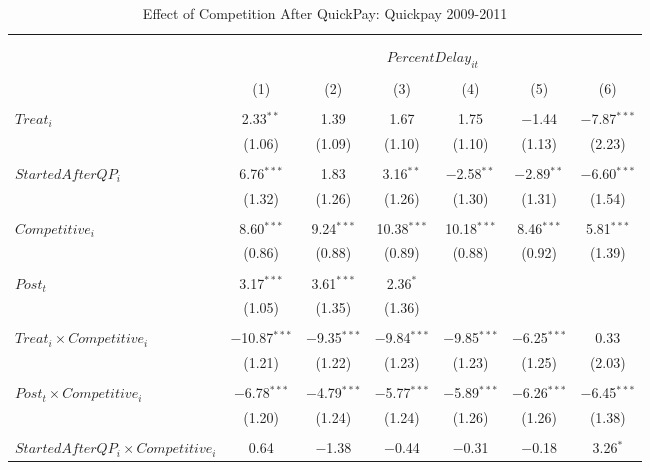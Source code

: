 \documentclass[
]{article}
\begin{document}
\begin{table}[H] \centering 
  \caption{Effect of Competition After QuickPay: Quickpay 2009-2011} 
  \label{} 
\small 
\begin{tabular}{@{\extracolsep{-3pt}}lcccccc} 
\\[-1.8ex]\hline 
\hline \\[-1.8ex] 
\\[-1.8ex] & \multicolumn{6}{c}{$PercentDelay_{it}$  } \\ 
\\[-1.8ex] & (1) & (2) & (3) & (4) & (5) & (6)\\ 
\hline \\[-1.8ex] 
 $Treat_i$ & 2.33$^{**}$ & 1.39 & 1.67 & 1.75 & $-$1.44 & $-$7.87$^{***}$ \\ 
  & (1.06) & (1.09) & (1.10) & (1.10) & (1.13) & (2.23) \\ 
  & & & & & & \\ 
 $StartedAfterQP_i$ & 6.76$^{***}$ & 1.83 & 3.16$^{**}$ & $-$2.58$^{**}$ & $-$2.89$^{**}$ & $-$6.60$^{***}$ \\ 
  & (1.32) & (1.26) & (1.26) & (1.30) & (1.31) & (1.54) \\ 
  & & & & & & \\ 
 $Competitive_i$ & 8.60$^{***}$ & 9.24$^{***}$ & 10.38$^{***}$ & 10.18$^{***}$ & 8.46$^{***}$ & 5.81$^{***}$ \\ 
  & (0.86) & (0.88) & (0.89) & (0.88) & (0.92) & (1.39) \\ 
  & & & & & & \\ 
 $Post_t$ & 3.17$^{***}$ & 3.61$^{***}$ & 2.36$^{*}$ &  &  &  \\ 
  & (1.05) & (1.35) & (1.36) &  &  &  \\ 
  & & & & & & \\ 
 $Treat_i \times Competitive_i$ & $-$10.87$^{***}$ & $-$9.35$^{***}$ & $-$9.84$^{***}$ & $-$9.85$^{***}$ & $-$6.25$^{***}$ & 0.33 \\ 
  & (1.21) & (1.22) & (1.23) & (1.23) & (1.25) & (2.03) \\ 
  & & & & & & \\ 
 $Post_t \times Competitive_i$ & $-$6.78$^{***}$ & $-$4.79$^{***}$ & $-$5.77$^{***}$ & $-$5.89$^{***}$ & $-$6.26$^{***}$ & $-$6.45$^{***}$ \\ 
  & (1.20) & (1.24) & (1.24) & (1.26) & (1.26) & (1.38) \\ 
  & & & & & & \\ 
 $StartedAfterQP_i \times Competitive_i$ & 0.64 & $-$1.38 & $-$0.44 & $-$0.31 & $-$0.18 & 3.26$^{*}$ \\ 

\end{tabular}
\end{table}
\end{document}
